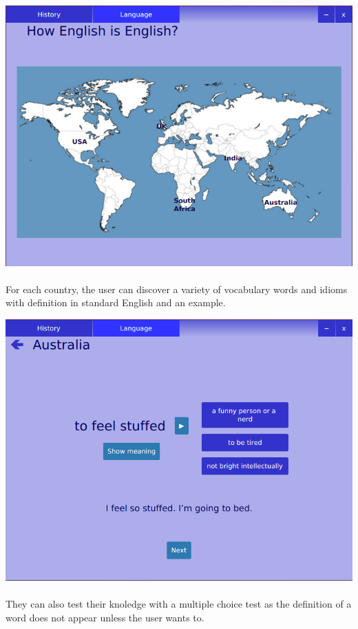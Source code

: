 \documentclass[11pt, a4paper]{report}
\begin{document}
\vspace{0.15cm}
\centerline{\includegraphics[scale=0.5]{images/languageTab.png}}

\paragraph{}For each country, the user can discover a variety of vocabulary words and idioms with definition in standard English and an example. 

\vspace{0.2cm}
\centerline{\includegraphics[scale=0.5]{images/AustraliaQuestion.png}}
\vspace{-0.35cm}

\paragraph{}They can also test their knoledge with a multiple choice test as the definition of a word does not appear unless the user wants to.
\end{document}
